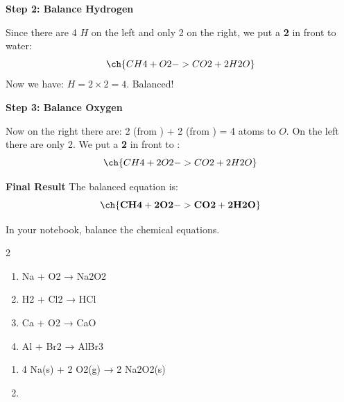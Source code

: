         {\noindent \textbf{Step 2: Balance Hydrogen}}

Since there are 4 $H$ on the left and only 2 on the right, we put a \textbf{2} in front to water:
\[ \ch{CH4 + O2 -> CO2 + 2 H2O} \]
Now we have: $H = 2 \times 2 = 4$. Balanced!

        {\noindent \textbf{Step 3: Balance Oxygen}}

Now on the right there are: 2 (from ) + 2 (from ) = 4 atoms to $O$.
On the left there are only 2. We put a \textbf{2} in front to :
\[ \ch{CH4 + 2 O2 -> CO2 + 2 H2O} \]

        {\noindent \textbf{Final Result}} The balanced equation is:
\[ \mathbf{\ch{CH4 + 2 O2 -> CO2 + 2 H2O}} \]


\begin{exercise}
    In your notebook, balance the chemical equations.
    \begin{multicols}{2}
        \begin{enumerate}[label=\letraminuscula]
            \item
            \begin{reaction*}
                Na\sld{} + O2\gas{}  → Na2O2\sld{}
            \end{reaction*}
            \item
            \begin{reaction*}
                H2 \gas{} + Cl2\gas{} → HCl\gas{}
            \end{reaction*}
            \item
            \begin{reaction*}
                Ca\sld{} + O2\gas{} → CaO\sld{}
            \end{reaction*}
            \item
            \begin{reaction*}
                Al\sld{} + Br2\lqd{} → AlBr3\sld{}
            \end{reaction*}
        \end{enumerate}
    \end{multicols}
    \begin{solu}
        \begin{enumerate}[label=\letraminuscula]
            \item
            \begin{reaction*}
                4 Na(s) + 2 O2(g) → 2 Na2O2(s)
            \end{reaction*}
            \item

\end{enumerate}
\end{solu}
\end{exercise}
